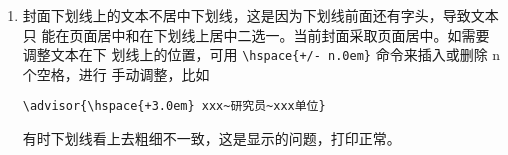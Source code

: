 \begin{enumerate}
    \item 封面下划线上的文本不居中下划线，这是因为下划线前面还有字头，导致文本只
    能在页面居中和在下划线上居中二选一。当前封面采取页面居中。如需要调整文本在下
    划线上的位置，可用 \verb|\hspace{+/- n.0em}| 命令来插入或删除 n 个空格，进行
    手动调整，比如

        \verb|\advisor{\hspace{+3.0em} xxx~研究员~xxx单位}|
                
    有时下划线看上去粗细不一致，这是显示的问题，打印正常。
\end{enumerate}


